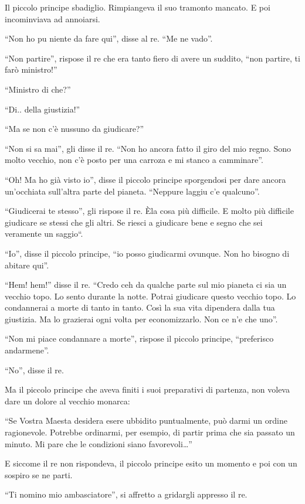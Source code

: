 \documentclass[11pt]{scrbook}
\begin{document}
Il piccolo principe sbadiglio. Rimpiangeva il suo tramonto mancato. E
poi incominviava ad annoiarsi.

``Non ho pu niente da fare qui'', disse al re. ``Me ne vado''.

``Non partire'', rispose il re che era tanto fiero di avere un suddito,
``non partire, ti farò ministro!''

``Ministro di che?''

``Di.. della giustizia!''

``Ma se non c'è nussuno da giudicare?''

``Non si sa mai'', gli disse il re. ``Non ho ancora fatto il giro del
mio regno. Sono molto vecchio, non c'è posto per una carroza e mi stanco
a camminare''.

``Oh! Ma ho già visto io'', disse il piccolo principe sporgendosi per
dare ancora un'occhiata sull'altra parte del pianeta. ``Neppure laggiu
c'e qualcuno''.

``Giudicerai te stesso'', gli rispose il re. Èla cosa più difficile. E
molto più difficile giudicare se stessi che gli altri. Se riesci a
giudicare bene e segno che sei veramente un saggio``.

``Io'', disse il piccolo principe, ``io posso giudicarmi ovunque. Non ho
bisogno di abitare qui''.

``Hem! hem!'' disse il re. ``Credo ceh da qualche parte sul mio pianeta
ci sia un vecchio topo. Lo sento durante la notte. Potrai giudicare
questo vecchio topo. Lo condannerai a morte di tanto in tanto. Così la
sua vita dipendera dalla tua giustizia. Ma lo grazierai ogni volta per
economizzarlo. Non ce n'e che uno''.

``Non mi piace condannare a morte'', rispose il piccolo principe,
``preferisco andarmene''.

``No'', disse il re.

Ma il piccolo principe che aveva finiti i suoi preparativi di partenza,
non voleva dare un dolore al vecchio monarca:

``Se Vostra Maesta desidera esere ubbidito puntualmente, può darmi un
ordine ragionevole. Potrebbe ordinarmi, per esempio, di partir prima che
sia passato un minuto. Mi pare che le condizioni siano
favorevoli\ldots{}''

E siccome il re non rispondeva, il piccolo principe esito un momento e
poi con un sospiro se ne parti.

``Ti nomino mio ambasciatore'', si affretto a gridargli appresso il re.
\end{document}
